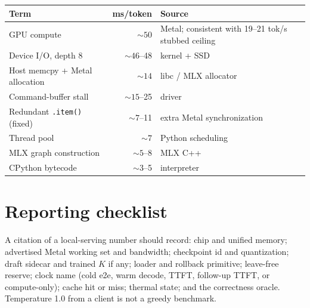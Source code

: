 \begin{center}
\small
\begin{tabular}{@{}lrl@{}}
\toprule
Term & ms/token & Source \\
\midrule
GPU compute & ${\sim}50$ & Metal; consistent with 19--21 tok/s stubbed ceiling \\
Device I/O, depth 8 & ${\sim}46$--48 & kernel + SSD \\
Host memcpy + Metal allocation & ${\sim}14$ & libc / MLX allocator \\
Command-buffer stall & ${\sim}15$--25 & driver \\
Redundant \texttt{.item()} (fixed) & ${\sim}7$--11 & extra Metal synchronization \\
Thread pool & ${\sim}7$ & Python scheduling \\
MLX graph construction & ${\sim}5$--8 & MLX C++ \\
CPython bytecode & ${\sim}3$--5 & interpreter \\
\bottomrule
\end{tabular}
\end{center}

\section{Reporting checklist}
\label{app:checklist}

A citation of a local-serving number should record: chip and unified memory; advertised Metal working set and bandwidth; checkpoint id and quantization; draft sidecar and trained $K$ if any; loader and rollback primitive; leave-free reserve; clock name (cold e2e, warm decode, TTFT, follow-up TTFT, or compute-only); cache hit or miss; thermal state; and the correctness oracle. Temperature 1.0 from a client is not a greedy benchmark.


